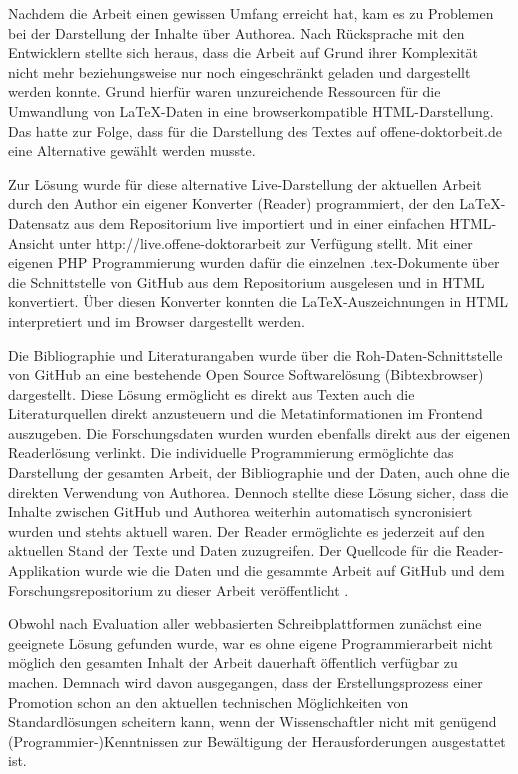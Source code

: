 Nachdem die Arbeit einen gewissen Umfang erreicht hat, kam es zu Problemen bei der Darstellung der Inhalte über Authorea. Nach Rücksprache mit den Entwicklern stellte sich heraus, dass die Arbeit auf Grund ihrer Komplexität nicht mehr beziehungsweise nur noch eingeschränkt geladen und dargestellt werden konnte. Grund hierfür waren unzureichende Ressourcen für die Umwandlung von LaTeX-Daten in eine browserkompatible HTML-Darstellung. Das hatte zur Folge, dass für die Darstellung des Textes auf offene-doktorbeit.de eine Alternative gewählt werden musste.

Zur Lösung wurde für diese alternative Live-Darstellung der aktuellen Arbeit durch den Author ein eigener Konverter (Reader) programmiert, der den LaTeX-Datensatz aus dem Repositorium live importiert und in einer einfachen HTML-Ansicht unter http://live.offene-doktorarbeit zur Verfügung stellt. Mit einer eigenen PHP Programmierung wurden dafür die einzelnen .tex-Dokumente über die Schnittstelle von GitHub aus dem Repositorium ausgelesen und in HTML konvertiert. Über diesen Konverter konnten die LaTeX-Auszeichnungen in HTML interpretiert und im Browser dargestellt werden.

Die Bibliographie und Literaturangaben wurde über die Roh-Daten-Schnittstelle von GitHub an eine bestehende Open Source Softwarelösung (Bibtexbrowser) dargestellt. Diese Lösung ermöglicht es direkt aus Texten auch die Literaturquellen direkt anzusteuern und die Metatinformationen im Frontend auszugeben. Die Forschungsdaten wurden wurden ebenfalls direkt aus der eigenen Readerlösung verlinkt. Die individuelle Programmierung ermöglichte das Darstellung der gesamten Arbeit, der Bibliographie und der Daten, auch ohne die direkten Verwendung von Authorea. Dennoch stellte diese Lösung sicher, dass die Inhalte zwischen GitHub und Authorea weiterhin automatisch syncronisiert wurden und stehts aktuell waren. Der Reader ermöglichte es jederzeit auf den aktuellen Stand der Texte und Daten zuzugreifen. Der Quellcode für die Reader-Applikation wurde wie die Daten und die gesammte Arbeit auf GitHub und dem Forschungsrepositorium zu dieser Arbeit veröffentlicht \cite{heise_2015_reader}.

Obwohl nach Evaluation aller webbasierten Schreibplattformen zunächst eine geeignete Lösung gefunden wurde, war es ohne eigene Programmierarbeit nicht möglich den gesamten Inhalt der Arbeit dauerhaft öffentlich verfügbar zu machen. Demnach wird davon ausgegangen, dass der Erstellungsprozess einer Promotion schon an den aktuellen technischen Möglichkeiten von Standardlösungen scheitern kann, wenn der Wissenschaftler nicht mit genügend (Programmier-)Kenntnissen zur Bewältigung der Herausforderungen ausgestattet ist.

